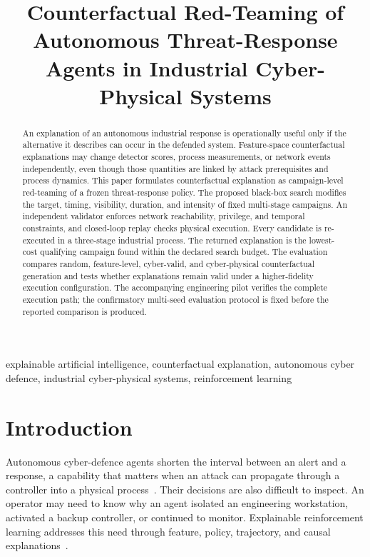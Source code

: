 \documentclass[conference]{IEEEtran}
\title{Counterfactual Red-Teaming of Autonomous Threat-Response Agents in Industrial Cyber-Physical Systems}
\author{\IEEEauthorblockN{Ichrak Hamdi}
\IEEEauthorblockA{Department of Computer Science and Software Engineering\\
Universit\'e Laval, Qu\'ebec, Canada\\
ichrak.hamdi.1@ulaval.ca}}
\begin{document}
\maketitle

\begin{abstract}
An explanation of an autonomous industrial response is operationally useful
only if the alternative it describes can occur in the defended system.
Feature-space counterfactual explanations may change detector scores, process
measurements, or network events independently, even though those quantities are
linked by attack prerequisites and process dynamics. This paper formulates
counterfactual explanation as campaign-level red-teaming of a frozen threat-response
policy. The proposed black-box search modifies the target, timing, visibility,
duration, and intensity of fixed multi-stage campaigns. An independent validator enforces
network reachability, privilege, and temporal constraints, and closed-loop
replay checks physical execution. Every candidate is re-executed in a
three-stage industrial process. The returned explanation is the lowest-cost
qualifying campaign found within the declared search budget. The evaluation compares random,
feature-level, cyber-valid, and cyber-physical counterfactual generation and
tests whether explanations remain valid under a higher-fidelity execution
configuration. The accompanying engineering pilot verifies the complete
execution path; the confirmatory multi-seed evaluation protocol is fixed before
the reported comparison is produced.
\end{abstract}

\begin{IEEEkeywords}
explainable artificial intelligence, counterfactual explanation, autonomous
cyber defence, industrial cyber-physical systems, reinforcement learning
\end{IEEEkeywords}

\section{Introduction}

Autonomous cyber-defence agents shorten the interval between an alert and a
response, a capability that matters when an attack can propagate through a
controller into a physical process~\cite{kott2019aica}. Their decisions are also
difficult to inspect. An operator may need to know why an agent isolated an
engineering workstation, activated a backup controller, or continued to
monitor. Explainable reinforcement learning addresses this need through feature,
policy, trajectory, and causal explanations~\cite{milani2024xrl,madumal2020causal}.
\end{document}
